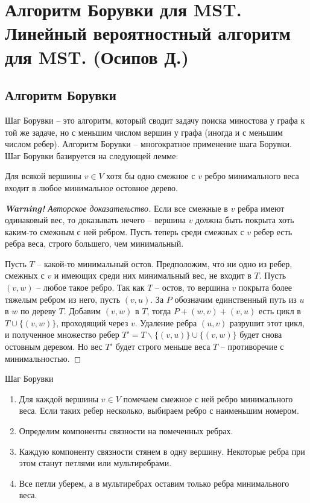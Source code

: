 \section{Алгоритм Борувки для MST. Линейный вероятностный алгоритм для MST. (Осипов Д.)}

\newcommand{\achtung}{\color{red}\textbf{Warning!} Авторское доказательство}

\subsection{Алгоритм Борувки}
Шаг Борувки -- это алгоритм, который сводит задачу поиска миностова у графа к той же задаче, но с меньшим числом вершин у графа (иногда и с меньшим числом ребер). Алгоритм Борувки -- многократное применение шага Борувки. Шаг Борувки базируется на следующей лемме:

\begin{lemma*} Для всякой вершины $v \in V$ хотя бы одно смежное с $v$ ребро минимального веса входит в любое минимальное остовное дерево. \end{lemma*}
\begin{proof}[\achtung]
Если все смежные в $v$ ребра имеют одинаковый вес, то доказывать нечего -- вершина $v$ должна быть покрыта хоть каким-то смежным с ней ребром. Пусть теперь среди смежных с $v$ ребер есть ребра веса, строго большего, чем минимальный.

Пусть $T$ -- какой-то минимальный остов. Предположим, что ни одно из ребер, смежных с $v$ и имеющих среди них минимальный вес, не входит в $T$. Пусть $(v, w)$ -- любое такое ребро. Так как $T$ -- остов, то вершина $v$ покрыта более тяжелым ребром из него, пусть $(v, u)$. За $P$ обозначим единственный путь из $u$ в $w$ по дереву $T$. Добавим $(v, w)$ в $T$, тогда $P + (w, v) + (v, u)$ есть цикл в $T\cup\{(v, w)\}$, проходящий через $v$. Удаление ребра $(u, v)$ разрушит этот цикл, и полученное множество ребер $T' = T\smallsetminus \{(v, u)\} \cup \{(v, w)\}$ будет снова остовным деревом. Но вес $T'$ будет строго меньше веса $T$ -- противоречие с минимальностью.
\end{proof}

\begin{algodescription}{Шаг Борувки}
\begin{enumerate}
    \item Для каждой вершины $v \in V$ помечаем смежное с ней ребро минимального веса. Если таких ребер несколько, выбираем ребро с наименьшим номером.
    \item Определим компоненты связности на помеченных ребрах.
    \item Каждую компоненту связности стянем в одну вершину. Некоторые ребра при этом станут петлями или мультиребрами.
    \item Все петли уберем, а в мультиребрах оставим только ребра минимального веса.
\end{enumerate}
\end{algodescription}

